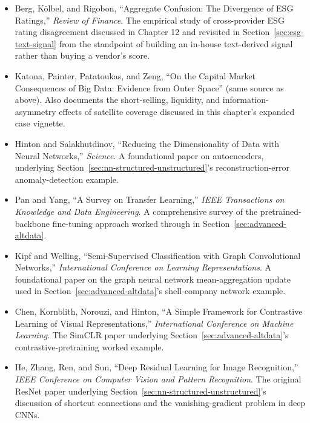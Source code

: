 \documentclass[../ai_in_finance]{subfiles}
\begin{document}
\begin{itemize}
    \item Berg, Kölbel, and Rigobon, ``Aggregate Confusion: The Divergence of ESG Ratings,'' \emph{Review of Finance}. The empirical study of cross-provider ESG rating disagreement discussed in Chapter 12 and revisited in Section~\ref{sec:esg-text-signal} from the standpoint of building an in-house text-derived signal rather than buying a vendor's score.
    \item Katona, Painter, Patatoukas, and Zeng, ``On the Capital Market Consequences of Big Data: Evidence from Outer Space'' (same source as above). Also documents the short-selling, liquidity, and information-asymmetry effects of satellite coverage discussed in this chapter's expanded case vignette.
    \item Hinton and Salakhutdinov, ``Reducing the Dimensionality of Data with Neural Networks,'' \emph{Science}. A foundational paper on autoencoders, underlying Section~\ref{sec:nn-structured-unstructured}'s reconstruction-error anomaly-detection example.
    \item Pan and Yang, ``A Survey on Transfer Learning,'' \emph{IEEE Transactions on Knowledge and Data Engineering}. A comprehensive survey of the pretrained-backbone fine-tuning approach worked through in Section~\ref{sec:advanced-altdata}.
    \item Kipf and Welling, ``Semi-Supervised Classification with Graph Convolutional Networks,'' \emph{International Conference on Learning Representations}. A foundational paper on the graph neural network mean-aggregation update used in Section~\ref{sec:advanced-altdata}'s shell-company network example.
    \item Chen, Kornblith, Norouzi, and Hinton, ``A Simple Framework for Contrastive Learning of Visual Representations,'' \emph{International Conference on Machine Learning}. The SimCLR paper underlying Section~\ref{sec:advanced-altdata}'s contrastive-pretraining worked example.
    \item He, Zhang, Ren, and Sun, ``Deep Residual Learning for Image Recognition,'' \emph{IEEE Conference on Computer Vision and Pattern Recognition}. The original ResNet paper underlying Section~\ref{sec:nn-structured-unstructured}'s discussion of shortcut connections and the vanishing-gradient problem in deep CNNs.
\end{itemize}
\end{document}
